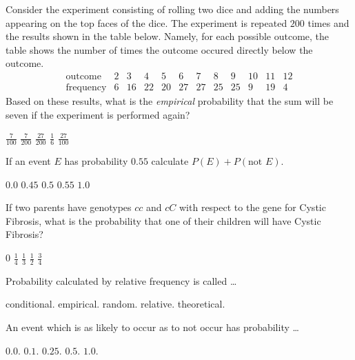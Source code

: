 \documentclass[12pt]{exam}
\begin{document}
\begin{questions}
\question Consider the experiment consisting
of rolling two dice and adding the numbers
appearing on the top faces of the dice.
The experiment is repeated $200$ times and the
results shown in the table below. Namely, 
for each possible outcome, the table shows the number
of times the outcome occured directly below the outcome.
\[\begin{array}{r|ccccccccccc}
\text{outcome}&2&3&4&5&6&7&8&9&10&11&12\\\hline
\text{frequency}&6&16&22&20&27&27&25&25&9&19&4
\end{array}\]
Based on these results, what is the {\em empirical} probability
that the sum will be seven if the experiment is performed again?\\
\begin{oneparchoices}
\choice $\frac{7}{100}$
\choice $\frac{7}{200}$
\choice $\frac{27}{200}$
\choice $\frac{1}{6}$
\choice $\frac{27}{100}$
\end{oneparchoices}

\question If an event $E$ has probability $0.55$
calculate $P\left(E\right)+P\left(\text{not $E$}\right)$.\\
\begin{oneparchoices}
\choice $0.0$
\choice $0.45$
\choice $0.5$
\choice $0.55$
\choice $1.0$
\end{oneparchoices}

\question If two parents have genotypes $cc$ and $cC$
with respect to the gene for Cystic Fibrosis, what
is the probability that one of their children will have
Cystic Fibrosis?
\begin{onepairchoices}
\choice $0$
\choice $\frac{1}{4}$
\choice $\frac{1}{3}$
\choice $\frac{1}{2}$
\choice $\frac{3}{4}$
\end{onepairchoices}

\question Probability calculated by relative frequency is called \dots\\
\begin{oneparchoices}
\choice conditional.
\choice empirical.
\choice random.
\choice relative.
\choice theoretical.
\end{oneparchoices}

\question An event which is as likely to occur as to not occur has probability \dots\\
\begin{oneparchoices}
\choice $0.0$.
\choice $0.1$.
\choice $0.25$.
\choice $0.5$.
\choice $1.0$.
\end{oneparchoices}

\end{questions}
\end{document}
